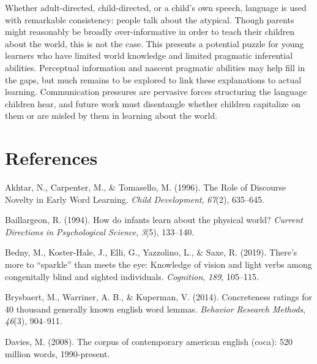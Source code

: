 \documentclass[10pt, letterpaper]{article}
\begin{document}
Whether adult-directed, child-directed, or a child's own speech,
language is used with remarkable consistency: people talk about the
atypical. Though parents might reasonably be broadly over-informative in
order to teach their children about the world, this is not the case.
This presents a potential puzzle for young learners who have limited
world knowledge and limited pragmatic inferential abilities. Perceptual
information and nascent pragmatic abilities may help fill in the gaps,
but much remains to be explored to link these explanations to actual
learning. Communication pressures are pervasive forces structuring the
language children hear, and future work must disentangle whether
children capitalize on them or are misled by them in learning about the
world.

\vspace{1em} 

\hypertarget{references}{%
\section{References}\label{references}}

\setlength{\parindent}{-0.1in} 
\setlength{\leftskip}{0.125in}

\noindent

\hypertarget{refs}{}
\leavevmode\hypertarget{ref-akhtar_1996}{}%
Akhtar, N., Carpenter, M., \& Tomasello, M. (1996). The Role of
Discourse Novelty in Early Word Learning. \emph{Child Development},
\emph{67}(2), 635--645.

\leavevmode\hypertarget{ref-baillargeon1994}{}%
Baillargeon, R. (1994). How do infants learn about the physical world?
\emph{Current Directions in Psychological Science}, \emph{3}(5),
133--140.

\leavevmode\hypertarget{ref-bedny2019}{}%
Bedny, M., Koster-Hale, J., Elli, G., Yazzolino, L., \& Saxe, R. (2019).
There's more to ``sparkle'' than meets the eye: Knowledge of vision and
light verbs among congenitally blind and sighted individuals.
\emph{Cognition}, \emph{189}, 105--115.

\leavevmode\hypertarget{ref-brysbaert2014}{}%
Brysbaert, M., Warriner, A. B., \& Kuperman, V. (2014). Concreteness
ratings for 40 thousand generally known english word lemmas.
\emph{Behavior Research Methods}, \emph{46}(3), 904--911.

\leavevmode\hypertarget{ref-davies2008}{}%
Davies, M. (2008). The corpus of contemporary american english (coca):
520 million words, 1990-present.
\end{document}
